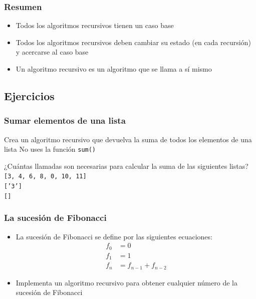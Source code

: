 \documentclass[11pt]{beamer}
\begin{document}
	\begin{frame}\frametitle{Resumen}
	\begin{itemize}
	\item Todos los algoritmos recursivos tienen un caso base
	\item Todos los algoritmos recursivos deben cambiar su estado (en cada recursión) y acercarse al caso base
	\item Un algoritmo recursivo es un algoritmo que se llama a sí mismo
	\end{itemize}
	\end{frame}

	\subsection{Ejercicios}

	\begin{frame}\frametitle{Sumar elementos de una lista}
	\begin{block}{Crea un algoritmo recursivo que devuelva la suma de todos los elementos de una lista}
No uses la función \texttt{sum()}
\end{block}
	\begin{block}{¿Cuántas llamadas son necesarias para calcular la suma de las siguientes listas?}
\texttt{[3, 4, 6, 8, 0, 10, 11]} \\
\texttt{['3']} \\
\texttt{[]}
\end{block}
	\end{frame}

	\begin{frame}\frametitle{La sucesión de Fibonacci}
	\begin{itemize}
	\item La sucesión de Fibonacci se define por las siguientes ecuaciones:
	\begin{equation*}
	\begin{aligned}
	f_0 &= 0\\
f_1 &= 1\\
f_n &= f_{n-1} + f_{n-2}
	\end{aligned}
	\end{equation*}
	\item Implementa un algoritmo recursivo para obtener cualquier número de la sucesión de Fibonacci
	\end{itemize}
	\end{frame}
\end{document}
